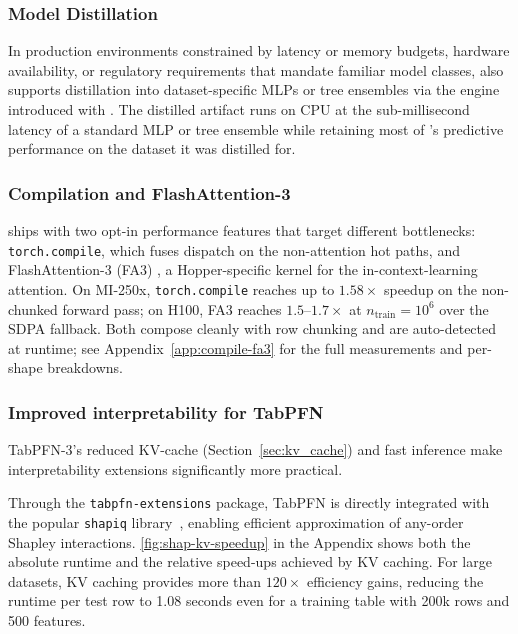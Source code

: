 \subsubsection{Model Distillation} \label{sec:distillation}
In production environments constrained by latency or memory budgets, hardware availability, or regulatory requirements that mandate familiar model classes, \ourmodel also supports distillation into dataset-specific MLPs or tree ensembles via the engine introduced with \ourmodeltwofive \citep{TabPFN-2.5}. The distilled artifact runs on CPU at the sub-millisecond latency of a standard MLP or tree ensemble while retaining most of \ourmodel's predictive performance on the dataset it was distilled for.  

\subsubsection{Compilation and FlashAttention-3} \label{sec:compile_and_fa3}

\ourmodel ships with two opt-in performance features that target different bottlenecks: \texttt{torch.compile}, which fuses dispatch on the non-attention hot paths, and FlashAttention-3 (FA3) \cite{flash_attention_3}, a Hopper-specific kernel for the in-context-learning attention. On MI-250x, \texttt{torch.compile} reaches up to $1.58{\times}$ speedup on the non-chunked forward pass; on H100, FA3 reaches $1.5\text{--}1.7{\times}$ at $n_\mathrm{train}=10^6$ over the SDPA fallback. Both compose cleanly with row chunking and are auto-detected at runtime; see Appendix~\ref{app:compile-fa3} for the full measurements and per-shape breakdowns.


\subsubsection{Improved interpretability for TabPFN}


TabPFN-3's reduced KV-cache (Section~\ref{sec:kv_cache}) and fast inference make interpretability extensions significantly more practical.

Through the \texttt{tabpfn-extensions} package, TabPFN is directly integrated with the popular \texttt{shapiq} library~\citep{shapiq}, enabling efficient approximation of any-order Shapley interactions. \autoref{fig:shap-kv-speedup} in the Appendix shows both the absolute runtime and the relative speed-ups achieved by KV caching. For large datasets, KV caching provides more than $120\times$ efficiency gains, reducing the runtime per test row to 1.08 seconds even for a training table with 200k rows and 500 features.




